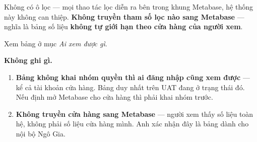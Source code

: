 Không có ô lọc --- mọi thao tác lọc diễn ra bên trong khung Metabase, hệ thống này không can
thiệp. \textbf{Không truyền tham số lọc nào sang Metabase} --- nghĩa là bảng số liệu
\textbf{không tự giới hạn theo cửa hàng của người xem}.


Xem bảng ở mục \emph{Ai xem được gì}.

\mghi

\textbf{Không ghi gì.}

\mhoi

\begin{ask}
\begin{enumerate}[leftmargin=*]
  \item \textbf{Bảng không khai nhóm quyền thì ai đăng nhập cũng xem được} --- kể cả tài khoản
        cửa hàng. Bảng duy nhất trên UAT đang ở trạng thái đó. Nếu định mở Metabase cho cửa
        hàng thì phải khai nhóm trước.
  \item \textbf{Không truyền cửa hàng sang Metabase} --- người xem thấy số liệu toàn hệ, không
        phải số liệu cửa hàng mình. Anh xác nhận đây là bảng dành cho nội bộ Ngô Gia.
\end{enumerate}
\end{ask}
